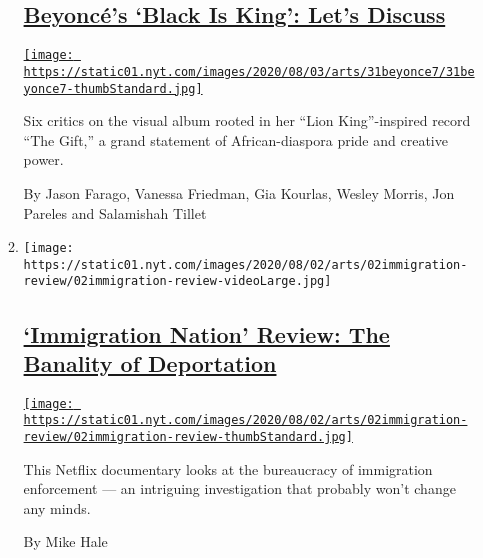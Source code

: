 \begin{enumerate}
\begin{enumerate}
    \hypertarget{beyoncuxe9s-black-is-king-lets-discuss}{%
    \subsection{\texorpdfstring{\href{/2020/07/31/arts/music/beyonce-black-is-king.html}{Beyoncé's
    `Black Is King': Let's
    Discuss}}{Beyoncé's `Black Is King': Let's Discuss}}\label{beyoncuxe9s-black-is-king-lets-discuss}}

    \href{/2020/07/31/arts/music/beyonce-black-is-king.html}{\texttt{[image: https://static01.nyt.com/images/2020/08/03/arts/31beyonce7/31beyonce7-thumbStandard.jpg]}}

    Six critics on the visual album rooted in her ``Lion King''-inspired
    record ``The Gift,'' a grand statement of African-diaspora pride and
    creative power.

    By Jason Farago, Vanessa Friedman, Gia Kourlas, Wesley Morris, Jon
    Pareles and Salamishah Tillet
  \item
    \texttt{[image: https://static01.nyt.com/images/2020/08/02/arts/02immigration-review/02immigration-review-videoLarge.jpg]}

    \hypertarget{immigration-nation-review-the-banality-of-deportation}{%
    \subsection{\texorpdfstring{\href{/2020/08/02/arts/television/immigration-nation-review-netflix.html}{`Immigration
    Nation' Review: The Banality of
    Deportation}}{`Immigration Nation' Review: The Banality of Deportation}}\label{immigration-nation-review-the-banality-of-deportation}}

    \href{/2020/08/02/arts/television/immigration-nation-review-netflix.html}{\texttt{[image: https://static01.nyt.com/images/2020/08/02/arts/02immigration-review/02immigration-review-thumbStandard.jpg]}}

    This Netflix documentary looks at the bureaucracy of immigration
    enforcement --- an intriguing investigation that probably won't
    change any minds.

    By Mike Hale
  \end{enumerate}
\end{enumerate}

